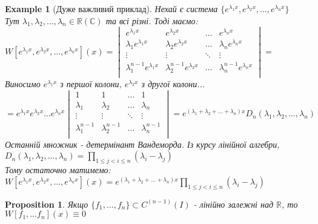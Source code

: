 \documentclass[a4paper, 10pt]{article}
\theoremstyle{theoremdd}
\theoremstyle{theoremdd}
\theoremstyle{theoremdd}
\theoremstyle{theoremdd}
\newtheorem{example}[theorem]{Example}
\theoremstyle{theoremdd}
\newtheorem{proposition}[theorem]{Proposition}
\theoremstyle{theoremdd}
\theoremstyle{theoremdd}
\theoremstyle{theoremdd}
\begin{document}
	\begin{example}[Дуже важливий приклад]
	Нехай є система $\displaystyle \{e^{\lambda_1 x}, e^{\lambda_2 x}, \dots, e^{\lambda_n x}\}$\\
	Тут $\lambda_1, \lambda_2, \dots, \lambda_n \in \mathbb{R} (\mathbb{C})$ та всі різні. Тоді маємо:\\
	$\displaystyle W[e^{\lambda_1 x}, e^{\lambda_2 x}, \dots, e^{\lambda_n x}](x) = 
\begin{vmatrix} 
	e^{\lambda_1 x} &  e^{\lambda_2 x} & \dots & e^{\lambda_n x} \\ 
	\lambda_1 e^{\lambda_1 x} &  \lambda_2 e^{\lambda_2 x} & \dots & \lambda_n e^{\lambda_n x} \\ 
	\vdots &  \vdots & \ddots & \vdots \\
	\lambda_1^{n-1} e^{\lambda_1 x} &  \lambda_2^{n-1} e^{\lambda_2 x} & \dots & \lambda_n^{n-1} e^{\lambda_n x} \\
\end{vmatrix} \boxed{=}$\\
Виносимо $e^{\lambda_1 x}$ з першої колони, $e^{\lambda_2 x}$ з другої колони...\\
$\displaystyle \boxed{=}
e^{\lambda_1 x} e^{\lambda_2 x} \dots e^{\lambda_n x}
\begin{vmatrix} 
	1 &  1 & \dots &  1 \\ 
	\lambda_1 &  \lambda_2 & \dots & \lambda_n \\ 
	\vdots &  \vdots & \ddots & \vdots \\
	\lambda_1^{n-1} &  \lambda_2^{n-1} & \dots & \lambda_n^{n-1} \\
\end{vmatrix} = e^{(\lambda_1+\lambda_2+\dots+\lambda_n)x} D_n(\lambda_1, \lambda_2, \dots, \lambda_n)
$\\
Останній множник - детермінант Вандеморда. Із курсу лінійної алгебри,\\
$\displaystyle D_n(\lambda_1, \lambda_2, \dots, \lambda_n) = \prod_{1 \leq j < i \leq n} (\lambda_i-\lambda_j)$\\
Тому остаточно матимемо:\\
$\displaystyle W[e^{\lambda_1 x}, e^{\lambda_2 x}, \dots, e^{\lambda_n x}](x) = e^{(\lambda_1+\lambda_2+\dots+\lambda_n)x} \prod_{1 \leq j < i \leq n} (\lambda_i-\lambda_j)$
\end{example}

	\begin{proposition}
 Якщо $\{f_1, \dots, f_n\} \subset C^{(n-1)}(I)$ - лінійно залежні над $\mathbb{R}$, то $W[f_1,\dots f_n](x) \equiv 0$
	\end{proposition}
\end{document}

